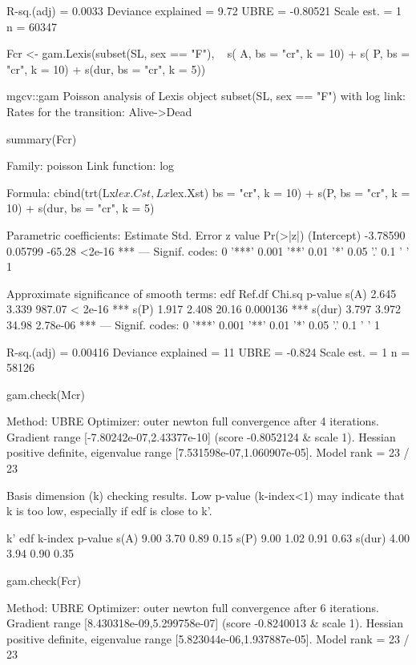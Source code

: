 \begin{enumerate}[resume]
\begin{Schunk}
\begin{Soutput}
R-sq.(adj) =  0.0033   Deviance explained = 9.72%
UBRE = -0.80521  Scale est. = 1         n = 60347
\end{Soutput}
\begin{Sinput}
 Fcr <- gam.Lexis(subset(SL, sex == "F"),
                  ~ s(  A, bs = "cr", k = 10) +
                    s(  P, bs = "cr", k = 10) +
                    s(dur, bs = "cr", k = 5))
\end{Sinput}
\begin{Soutput}
mgcv::gam Poisson analysis of Lexis object subset(SL, sex == "F") with log link:
Rates for the transition:
Alive->Dead
\end{Soutput}
\begin{Sinput}
 summary(Fcr)
\end{Sinput}
\begin{Soutput}
Family: poisson 
Link function: log 

Formula:
cbind(trt(Lx$lex.Cst, Lx$lex.Xst) %in% trnam, Lx$lex.dur) ~ s(A, 
    bs = "cr", k = 10) + s(P, bs = "cr", k = 10) + s(dur, bs = "cr", 
    k = 5)

Parametric coefficients:
            Estimate Std. Error z value Pr(>|z|)    
(Intercept) -3.78590    0.05799  -65.28   <2e-16 ***
---
Signif. codes:  0 '***' 0.001 '**' 0.01 '*' 0.05 '.' 0.1 ' ' 1

Approximate significance of smooth terms:
         edf Ref.df Chi.sq  p-value    
s(A)   2.645  3.339 987.07  < 2e-16 ***
s(P)   1.917  2.408  20.16 0.000136 ***
s(dur) 3.797  3.972  34.98 2.78e-06 ***
---
Signif. codes:  0 '***' 0.001 '**' 0.01 '*' 0.05 '.' 0.1 ' ' 1

R-sq.(adj) =  0.00416   Deviance explained =   11%
UBRE = -0.824  Scale est. = 1         n = 58126
\end{Soutput}
\begin{Sinput}
 gam.check(Mcr)
\end{Sinput}
\begin{Soutput}
Method: UBRE   Optimizer: outer newton
full convergence after 4 iterations.
Gradient range [-7.80242e-07,2.43377e-10]
(score -0.8052124 & scale 1).
Hessian positive definite, eigenvalue range [7.531598e-07,1.060907e-05].
Model rank =  23 / 23 

Basis dimension (k) checking results. Low p-value (k-index<1) may
indicate that k is too low, especially if edf is close to k'.

         k'  edf k-index p-value
s(A)   9.00 3.70    0.89    0.15
s(P)   9.00 1.02    0.91    0.63
s(dur) 4.00 3.94    0.90    0.35
\end{Soutput}
\begin{Sinput}
 gam.check(Fcr)
\end{Sinput}
\begin{Soutput}
Method: UBRE   Optimizer: outer newton
full convergence after 6 iterations.
Gradient range [8.430318e-09,5.299758e-07]
(score -0.8240013 & scale 1).
Hessian positive definite, eigenvalue range [5.823044e-06,1.937887e-05].
Model rank =  23 / 23 


\end{Soutput}
\end{Schunk}
\end{enumerate}
